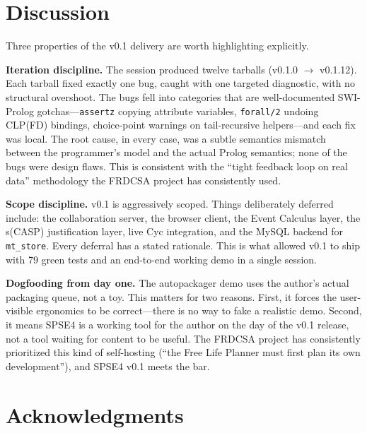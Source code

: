 \documentclass[11pt,letterpaper]{article}
\begin{document}
\section{Discussion}

Three properties of the v0.1 delivery are worth highlighting explicitly.

\textbf{Iteration discipline.} The session produced twelve tarballs
(v0.1.0 $\to$ v0.1.12). Each tarball fixed exactly one bug, caught with
one targeted diagnostic, with no structural overshoot. The bugs fell into
categories that are well-documented SWI-Prolog gotchas---\texttt{assertz}
copying attribute variables, \texttt{forall/2} undoing CLP(FD) bindings,
choice-point warnings on tail-recursive helpers---and each fix was local.
The root cause, in every case, was a subtle semantics mismatch between the
programmer's model and the actual Prolog semantics; none of the bugs were
design flaws. This is consistent with the ``tight feedback loop on real
data'' methodology the FRDCSA project has consistently used.

\textbf{Scope discipline.} v0.1 is aggressively scoped. Things
deliberately deferred include: the collaboration server, the browser
client, the Event Calculus layer, the s(CASP) justification layer, live
Cyc integration, and the MySQL backend for \texttt{mt\_store}. Every
deferral has a stated rationale. This is what allowed v0.1 to ship with
79 green tests and an end-to-end working demo in a single session.

\textbf{Dogfooding from day one.} The autopackager demo uses the author's
actual packaging queue, not a toy. This matters for two reasons. First,
it forces the user-visible ergonomics to be correct---there is no way to
fake a realistic demo. Second, it means SPSE4 is a working tool for the
author on the day of the v0.1 release, not a tool waiting for content to
be useful. The FRDCSA project has consistently prioritized this kind of
self-hosting (``the Free Life Planner must first plan its own
development''), and SPSE4 v0.1 meets the bar.

\section*{Acknowledgments}
\end{document}
